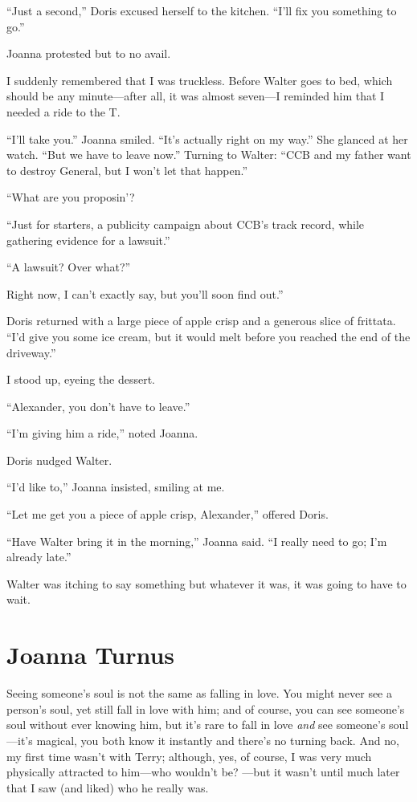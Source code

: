 ``Just a second,'' Doris excused herself to the kitchen. ``I'll fix you
something to go.''

Joanna protested but to no avail.

I suddenly remembered that I was truckless. Before Walter goes to bed,
which should be any minute---after all, it was almost seven---I reminded
him that I needed a ride to the T.

``I'll take you.'' Joanna smiled. ``It's actually right on my way.'' She
glanced at her watch. ``But we have to leave now.'' Turning to Walter:
``CCB and my father want to destroy General, but I won't let that
happen.''

``What are you proposin'?

``Just for starters, a publicity campaign about CCB's track record,
while gathering evidence for a lawsuit.''

``A lawsuit? Over what?''

Right now, I can't exactly say, but you'll soon find out.''

Doris returned with a large piece of apple crisp and a generous slice of
frittata. ``I'd give you some ice cream, but it would melt before you
reached the end of the driveway.''

I stood up, eyeing the dessert.

``Alexander, you don't have to leave.''

``I'm giving him a ride,'' noted Joanna.

Doris nudged Walter.

``I'd like to,'' Joanna insisted, smiling at me.

``Let me get you a piece of apple crisp, Alexander,'' offered Doris.

``Have Walter bring it in the morning,'' Joanna said. ``I really need to
go; I'm already late.''

Walter was itching to say something but whatever it was, it was going to
have to wait.

\chapter{Joanna Turnus}

\titlemark

Seeing someone's soul is not the same as falling in love. You might
never see a person's soul, yet still fall in love with him; and of
course, you can see someone's soul without ever knowing him, but it's
rare to fall in love \emph{and} see someone's soul---it's magical, you
both know it instantly and there's no turning back. And no, my first
time wasn't with Terry; although, yes, of course, I was very much
physically attracted to him---who wouldn't be? ---but it wasn't until
much later that I saw (and liked) who he really was.

